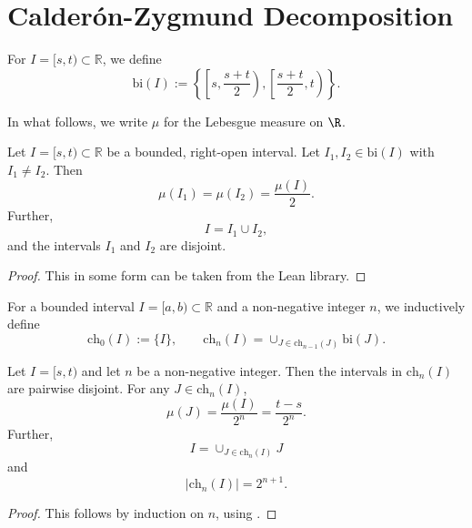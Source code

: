 \section{Calder\'on-Zygmund Decomposition}
\label{subsec-CZD}

For $I=[s, t)\subset \mathbb{R}$, we define
\begin{equation}
    \label{eq-bisec}
    \textrm{bi} (I):= \left\{\left[s, \frac{s+t}{2}\right), \left[\frac{s+t}{2}, t\right)\right\}.
\end{equation}

In what follows, we write $\mu$ for the Lebesgue measure on $\R$.

\begin{lemma}
\label{interval-bisection}
    Let $I=[s, t)\subset \mathbb{R}$ be a bounded, right-open interval. Let $I_1, I_2\in \textrm{bi} (I)$ with $I_1\neq I_2$. Then
    \begin{equation}
        \label{eq-bi-size}
        \mu (I_1)=\mu(I_2)=\frac{\mu(I)}{2}.
    \end{equation}
    Further,
    \begin{equation}
        \label{eq-bi-union}
        I=I_1\cup I_2,
    \end{equation}
    and the intervals $I_1$ and $I_2$ are disjoint.
\end{lemma}
\begin{proof}
    This in some form can be taken from the Lean library.
\end{proof}
For a bounded interval $I=[a, b)\subset \mathbb{R}$ and a non-negative integer $n$, we inductively define
\begin{equation}
    \label{eq-ch-I}
    \textrm{ch}_0(I):=\{I\}, \qquad \textrm{ch}_n(I)=\cup_{J\in \textrm{ch}_{n-1}(J)} \textrm{bi} (J).
\end{equation}

\begin{lemma}
    \label{bisection-children}
    Let $I=[s, t)$ and let $n$ be a non-negative integer. Then the intervals in $\textrm{ch}_n(I)$ are pairwise disjoint. For any $J\in \textrm{ch}_n(I)$,
    \begin{equation}
        \label{eq-ch-size}
        \mu(J)=\frac{\mu(I)}{2^{n}}=\frac{t-s}{2^n}.
    \end{equation}
    Further,
    \begin{equation}
        \label{eq-ch-cover}
        I= \cup_{J\in \textrm{ch}_n(I)} J
    \end{equation}
    and
    \begin{equation}
        \label{eq-ch-card}
        |\textrm{ch}_n(I)|= 2^{n+1}.
    \end{equation}
\end{lemma}
\begin{proof}
This follows by induction on $n$, using .
\end{proof}


